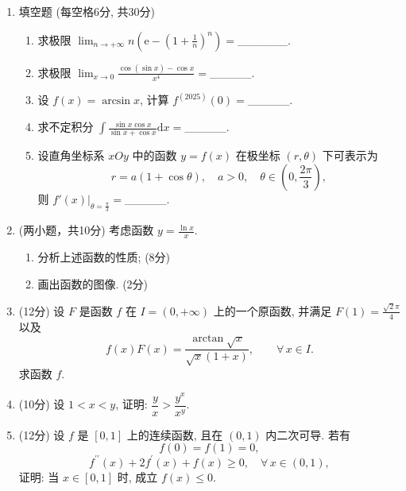 \begin{enumerate}

    \item 填空题 (每空格6分, 共30分)
        \begin{enumerate}
            \item[(1)] 求极限 
                $\displaystyle \lim_{n \rightarrow + \infty} n \left( \mathrm{e} - \left(1 + \frac{1}{n}\right) ^ n\right)=$______. 
            \item[(2)] 求极限
                $\displaystyle \lim_{x \rightarrow 0}\frac{\cos(\sin x) - \cos x}{x ^ 4} =$_____. 
            \item[(3)] 设 $f(x) = \arcsin x$, 计算 $f ^ {\left(2025\right)}(0) =$_____. 
            \item[(4)] 求不定积分 $\displaystyle\int\frac{\sin x \cos x}{\sin x + \cos x}\mathrm{d}x=$_____. 
            \item[(5)] 设直角坐标系 $xOy$ 中的函数 $y = f(x)$ 在极坐标 $(r , \theta)$ 下可表示为
                $$r = a \left( 1 + \cos \theta \right), \quad a > 0, \quad \theta \in \left( 0 , \frac{2\pi}{3} \right),$$
                则 $f'(x)|_ {\theta = \frac{\pi}{3}} =$_____. 
        \end{enumerate}
    
    \item (两小题，共10分) 考虑函数 $\displaystyle y = \frac{\ln x}{x}$. 
        \begin{enumerate}
            \item[(A)] 分析上述函数的性质; (8分)
            \item[(B)] 画出函数的图像. (2分)
        \end{enumerate}
    
    \item (12分) 设 $F$ 是函数 $f$ 在 $I = ( 0 , + \infty )$ 上的一个原函数, 并满足 $\displaystyle F ( 1 ) = \frac{\sqrt 2 \pi}{4}$ 以及 
        $$f ( x ) F ( x ) = \frac{\arctan \sqrt x}{\sqrt x \left( 1 + x \right)}, \qquad \forall \, x \in I. $$
        求函数 $f$. 
    
    \item (10分) 设 $1 < x < y$, 证明: $\dfrac{y}{x} > \dfrac{y ^ x}{x ^ y}$. 

    \item (12分) 设 $f$ 是 $[0,1]$ 上的连续函数, 且在 $(0,1)$ 内二次可导. 若有
        $$f ( 0 ) = f ( 1 ) = 0,$$
        $$f ^ {\prime \prime} ( x ) + 2 f ^ \prime ( x ) + f ( x ) \geq 0, \quad \forall \, x \in ( 0 , 1 ), $$
        证明: 当 $x \in [ 0 , 1 ]$ 时, 成立 $f ( x ) \leq 0$. 
    

\end{enumerate}
